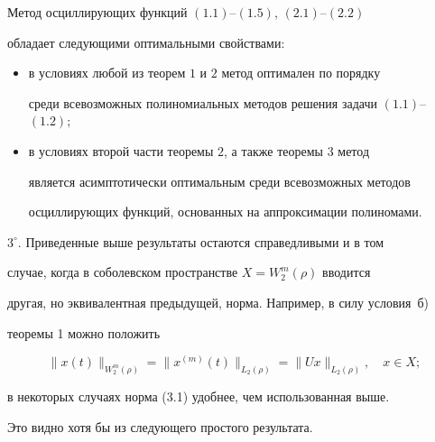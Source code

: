 \begin{thm}


Метод осциллирующих функций $(1.1)$--$(1.5)$, $(2.1)$--$(2.2)$


обладает следующими оптимальными свойствами$:$


\begin{itemize}


\item[а)] в условиях любой из теорем $1$ и $2$ метод оптимален по порядку 


среди всевозможных полиномиальных методов решения задачи $(1.1)$--$(1.2);$


\item[б)] в условиях второй части теоремы $2$, а также теоремы $3$ метод 


является асимптотически оптимальным среди всевозможных методов 


осциллирующих функций, основанных на аппроксимации полиномами.


\end{itemize}


\end{thm}





$3^\circ$. Приведенные выше результаты остаются справедливыми и в том 


случае, когда в соболевском пространстве $X = W_2^m(\rho)$ вводится 


другая, но эквивалентная предыдущей, норма. Например, в силу условия~б)


теоремы 1 можно положить


\begin{equation}


\|x(t)\|_{W_2^m(\rho)} = \|x^{(m)}(t)\|_{L_2(\rho)} =


\|Ux\|_{L_2(\rho)},\quad x\in X;


\end{equation}


в некоторых случаях норма (3.1) удобнее, чем использованная выше. 


Это видно хотя бы из следующего простого результата.





